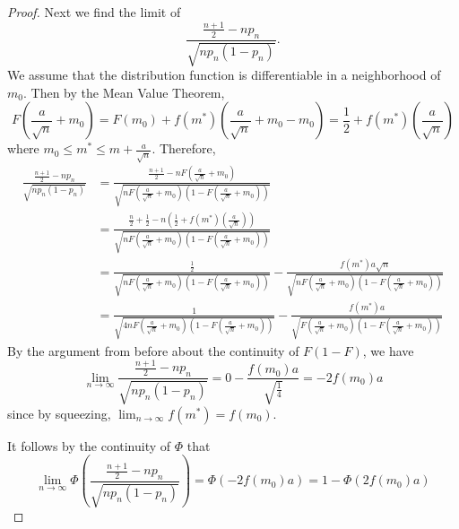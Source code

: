 \documentclass[letterpaper, 12pt]{article}
\begin{document}
\begin{proof}
Next we find the limit of 
\[
\frac{\frac{n+1}{2} - n p_n}{\sqrt{n p_n(1-p_n)}}.
\]
We assume that the distribution function is differentiable in a neighborhood of $m_0$. Then by the Mean Value Theorem,
\[
F
\left(\frac{a}{\sqrt{n}} + m_0\right)
=
F(m_0) + f(m^*) \left( 
\frac{a}{\sqrt{n}} + m_0 - m_0
\right)
=
\frac{1}{2} + f(m^*)\left(
\frac{a}{\sqrt{n}} 
\right)
\]
where $m_0 \leq m^* \leq m + \frac{a}{\sqrt{n}}$.
Therefore,
\begin{align*}
\frac{\frac{n+1}{2} - n p_n}{\sqrt{n p_n(1-p_n)}}
&=
\frac{\frac{n+1}{2} - n F
\left(\frac{a}{\sqrt{n}} + m_0\right)}{\sqrt{n F
\left(\frac{a}{\sqrt{n}} + m_0\right)\left(1-F
\left(\frac{a}{\sqrt{n}} + m_0\right)\right)}}
\\
&=
\frac{\frac{n}{2} +\frac{1}{2} - n \left( \frac{1}{2} + f(m^*)\left(
\frac{a}{\sqrt{n}} 
\right)\right)}{\sqrt{n F
\left(\frac{a}{\sqrt{n}} + m_0\right)\left(1-F
\left(\frac{a}{\sqrt{n}} + m_0\right)\right)}}
\\
&=
\frac{\frac{1}{2}}{\sqrt{n F
\left(\frac{a}{\sqrt{n}} + m_0\right)\left(1-F
\left(\frac{a}{\sqrt{n}} + m_0\right)\right)}}
-
\frac{ f(m^*)a \sqrt{n}}{\sqrt{n F
\left(\frac{a}{\sqrt{n}} + m_0\right)\left(1-F
\left(\frac{a}{\sqrt{n}} + m_0\right)\right)}}
\\
&=
\frac{1}{\sqrt{4n F
\left(\frac{a}{\sqrt{n}} + m_0\right)\left(1-F
\left(\frac{a}{\sqrt{n}} + m_0\right)\right)}}
-
\frac{ f(m^*)a}{\sqrt{F
\left(\frac{a}{\sqrt{n}} + m_0\right)\left(1-F
\left(\frac{a}{\sqrt{n}} + m_0\right)\right)}}
\end{align*}
By the argument from before about the continuity of $F(1 - F)$, we have 
\[
\lim_{n \to \infty} 
\frac{\frac{n+1}{2} - n p_n}{\sqrt{n p_n(1-p_n)}}
=
0 - \frac{f(m_0)a}{\sqrt{\frac{1}{4}}}
=
-2f(m_0)a
\]
since by squeezing, $\lim_{n \to \infty} f(m^*) = f(m_0)$.

It follows by the continuity of $\Phi$ that
\begin{equation}
\lim_{n \to \infty}
\Phi\left(\frac{\frac{n+1}{2} - n p_n}{\sqrt{n p_n(1-p_n)}}\right)
=
\Phi(-2f(m_0)a)
=
1 - \Phi(2f(m_0)a)
\label{phicont}
\end{equation}


\end{proof}
\end{document}
